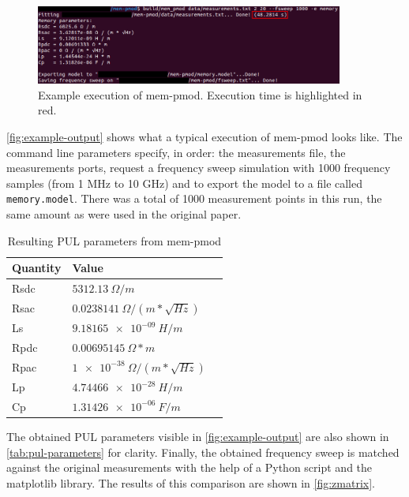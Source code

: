 \begin{figure}[htbp]
    \center
    \includegraphics[width = 0.9\textwidth]{img/example_output}
    \caption{Example execution of mem-pmod. Execution time is highlighted in red.}
    \label{fig:example-output}
\end{figure}
\autoref{fig:example-output} shows what a typical execution of mem-pmod looks like. The command line parameters specify, in order: the measurements file, the measurements ports, request a frequency sweep simulation with 1000 frequency samples (from 1 MHz to 10 GHz) and to export the model to a file called \texttt{memory.model}. There was a total of 1000 measurement points in this run, the same amount as were used in the original paper.
\begin{table}[htbp]
    \center
    \begin{tabular}{|l|l|l|}
        \hline
        Quantity & Value \\ \hline
        Rsdc & $\SI{5312.13}{\Omega / m}$ \\ \hline
        Rsac & $\SI{0.0238141}{\Omega / (m * \sqrt{Hz})}$ \\ \hline
        Ls   & $\SI{9.18165e-09}{H / m}$ \\ \hline
        Rpdc & $\SI{0.00695145}{\Omega * m}$ \\ \hline
        Rpac & $\SI{1e-38}{\Omega / (m * \sqrt{Hz})}$ \\ \hline
        Lp   & $\SI{4.74466e-28}{H / m}$ \\ \hline
        Cp   & $\SI{1.31426e-06}{F / m}$ \\ \hline
    \end{tabular}
    \caption{Resulting PUL parameters from mem-pmod}
    \label{tab:pul-parameters}
\end{table}
The obtained PUL parameters visible in \autoref{fig:example-output} are also shown in \autoref{tab:pul-parameters} for clarity. Finally, the obtained frequency sweep is matched against the original measurements with the help of a Python script and the matplotlib library. The results of this comparison are shown in \autoref{fig:zmatrix}.

